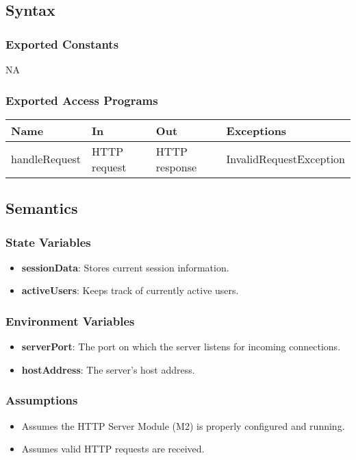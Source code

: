 \documentclass[12pt, titlepage]{article}
\begin{document}
\subsection{Syntax}
\subsubsection{Exported Constants}
NA
\subsubsection{Exported Access Programs}

\begin{center}
\begin{tabular}{p{2.5cm} p{3.5cm} p{3.5cm} p{3cm}}
\hline
\textbf{Name} & \textbf{In} & \textbf{Out} & \textbf{Exceptions} \\
\hline
handleRequest & HTTP request & HTTP response & InvalidRequestException \\
\hline
\end{tabular}
\end{center}
\subsection{Semantics}
\subsubsection{State Variables}
\begin{itemize}
  \item \textbf{sessionData}: Stores current session information.
  \item \textbf{activeUsers}: Keeps track of currently active users.
\end{itemize}
\subsubsection{Environment Variables}
\begin{itemize}
  \item \textbf{serverPort}: The port on which the server listens for incoming connections.
  \item \textbf{hostAddress}: The server's host address.
\end{itemize}
\subsubsection{Assumptions}
\begin{itemize}
  \item Assumes the HTTP Server Module (M2) is properly configured and running.
  \item Assumes valid HTTP requests are received.
\end{itemize}
\end{document}
